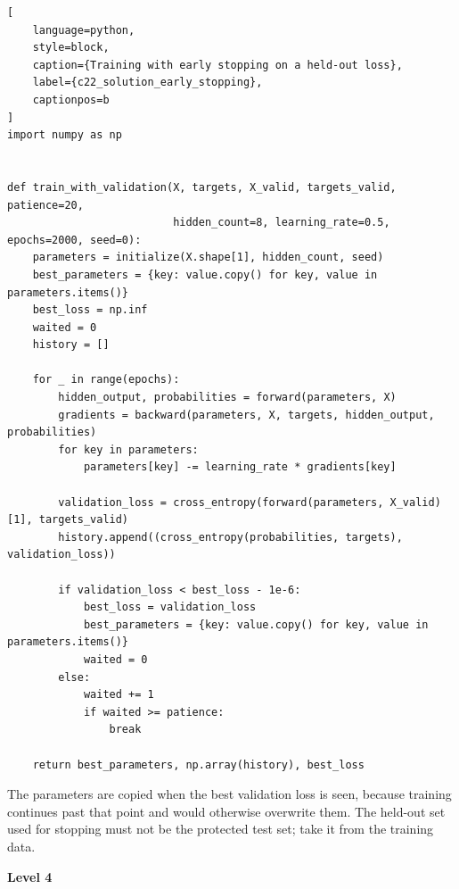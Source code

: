 \begin{lstlisting}[
    language=python,
    style=block,
    caption={Training with early stopping on a held-out loss},
    label={c22_solution_early_stopping},
    captionpos=b
]
import numpy as np


def train_with_validation(X, targets, X_valid, targets_valid, patience=20,
                          hidden_count=8, learning_rate=0.5, epochs=2000, seed=0):
    parameters = initialize(X.shape[1], hidden_count, seed)
    best_parameters = {key: value.copy() for key, value in parameters.items()}
    best_loss = np.inf
    waited = 0
    history = []

    for _ in range(epochs):
        hidden_output, probabilities = forward(parameters, X)
        gradients = backward(parameters, X, targets, hidden_output, probabilities)
        for key in parameters:
            parameters[key] -= learning_rate * gradients[key]

        validation_loss = cross_entropy(forward(parameters, X_valid)[1], targets_valid)
        history.append((cross_entropy(probabilities, targets), validation_loss))

        if validation_loss < best_loss - 1e-6:
            best_loss = validation_loss
            best_parameters = {key: value.copy() for key, value in parameters.items()}
            waited = 0
        else:
            waited += 1
            if waited >= patience:
                break

    return best_parameters, np.array(history), best_loss
\end{lstlisting}

The parameters are copied when the best validation loss is seen, because training
continues past that point and would otherwise overwrite them. The held-out set
used for stopping must not be the protected test set; take it from the training
data.

\textbf{Level 4}

